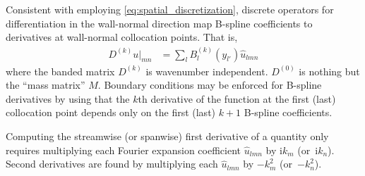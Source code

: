 \documentclass[letterpaper,11pt,nointlimits,reqno,draft]{amsart}
\newcommand{\ii}{\ensuremath{\mathrm{i}}}
\begin{document}
Consistent with employing \eqref{eq:spatial_discretization}, discrete operators
for differentiation in the wall-normal direction map B-spline coefficients to
derivatives at wall-normal collocation points.  That is,
\begin{align}
  D^{(k)} u\bigr|_{m n}
&= \sum_{l} B^{(k)}_l\!\left(y_{l'}\right)
   \hat{u}_{l m n}
\end{align}
where the banded matrix $D^{(k)}$ is wavenumber independent.  $D^{(0)}$ is
nothing but the ``mass matrix'' $M$.  Boundary conditions may be enforced for
B-spline derivatives by using that the $k$th derivative of the function at the
first (last) collocation point depends only on the first (last) $k+1$ B-spline
coefficients.

Computing the streamwise (or spanwise) first derivative of a quantity only
requires multiplying each Fourier expansion coefficient $\hat{u}_{l m n}$ by
$\ii k_{m}$ (or~$\ii k_{n}$).  Second derivatives are found by multiplying each
$\hat{u}_{l m n}$ by $-k_{m}^2$ (or~$-k_{n}^2$).
\end{document}
